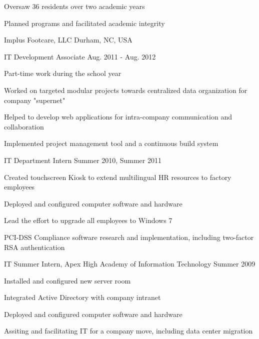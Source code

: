 \begin{cventries}
    {
      \begin{cvitems}
        \item {Oversaw 36 residents over two academic years}
	    \item {Planned programs and facilitated academic integrity}
      \end{cvitems}
    }
  \cvmultientry
    {Implus Footcare, LLC}
    {Durham, NC, USA}
    {
      \begin{cvsubentries}
      {
        \cvsubentry
        {IT Development Associate}
        {Aug. 2011 - Aug. 2012}
        {
          \begin{cvitems}
            \item Part-time work during the school year
	    \item Worked on targeted modular projects towards centralized data organization for company "supernet"
	    \item Helped to develop web applications for intra-company communication and collaboration
	    \item Implemented project management tool and a continuous build system
          \end{cvitems} 
        }
      }
      \cvsubentry
      {IT Department Intern}
      {Summer 2010, Summer 2011}
      {
        \begin{cvitems}
          \item Created touchscreen Kiosk to extend multilingual HR resources to factory employees
          \item Deployed and configured computer software and hardware
          \item Lead the effort to upgrade all employees to Windows 7
          \item PCI-DSS Compliance software research and implementation, including two-factor RSA authentication
        \end{cvitems}
      }
      \cvsubentry
      {IT Summer Intern, Apex High Academy of Information Technology}
      {Summer 2009}
      {
        \begin{cvitems}
          \item Installed and configured new server room
	  \item Integrated Active Directory with company intranet
	  \item Deployed and configured computer software and hardware
	  \item Assiting and facilitating IT for a company move, including data center migration
	\end{cvitems}
      }
      \end{cvsubentries}
    }
\end{cventries}
